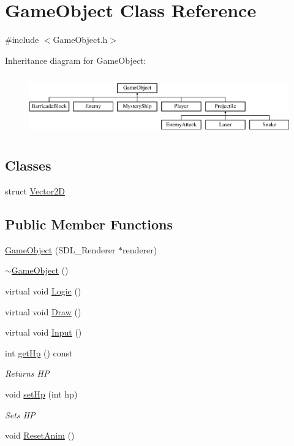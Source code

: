 \hypertarget{class_game_object}{}\section{Game\+Object Class Reference}
\label{class_game_object}


{\ttfamily \#include $<$Game\+Object.\+h$>$}

Inheritance diagram for Game\+Object\+:\begin{figure}[H]
\begin{center}
\leavevmode
\includegraphics[height=2.616822cm]{class_game_object}
\end{center}
\end{figure}
\subsection*{Classes}
\begin{DoxyCompactItemize}
\item 
struct \mbox{\hyperlink{struct_game_object_1_1_vector2_d}{Vector2D}}
\end{DoxyCompactItemize}
\subsection*{Public Member Functions}
\begin{DoxyCompactItemize}
\item 
\mbox{\hyperlink{class_game_object_a0b60783781874241ad26049ad968a78b}{Game\+Object}} (S\+D\+L\+\_\+\+Renderer $\ast$renderer)
\item 
\mbox{\hyperlink{class_game_object_ab82dfdb656f9051c0587e6593b2dda97}{$\sim$\+Game\+Object}} ()
\item 
virtual void \mbox{\hyperlink{class_game_object_a79510ffc77339fe850491dce9f580fa9}{Logic}} ()
\item 
virtual void \mbox{\hyperlink{class_game_object_ad3ac1deac50048cf7a1a19eb0e61ad26}{Draw}} ()
\item 
virtual void \mbox{\hyperlink{class_game_object_a430742cf91abb99337c556c88bef880a}{Input}} ()
\item 
int \mbox{\hyperlink{class_game_object_a13b96d5c268bca096f8e3a3e85d35732}{get\+Hp}} () const
\begin{DoxyCompactList}\small\item\em Returns HP \end{DoxyCompactList}\item 
void \mbox{\hyperlink{class_game_object_a7aa67e2bbfd37af89d86df0b030b5a81}{set\+Hp}} (int hp)
\begin{DoxyCompactList}\small\item\em Sets HP \end{DoxyCompactList}\item 
void \mbox{\hyperlink{class_game_object_a29708ce7009e5de901438b9a4f02e365}{Reset\+Anim}} ()
\end{DoxyCompactItemize}
